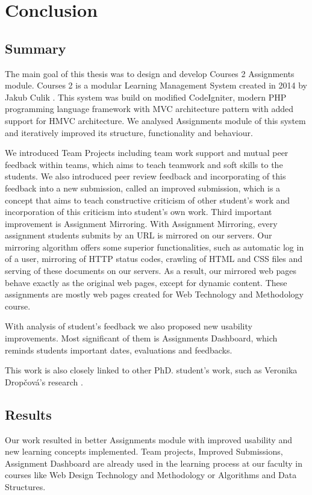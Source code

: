 \chapter*{Conclusion}

\section*{Summary}

The main goal of this thesis was to design and develop Courses 2 Assignments module. Courses 2 is a modular Learning Management System created in 2014 by Jakub Culik \cite{culik}. This system was build on modified CodeIgniter, modern PHP programming language framework with MVC architecture pattern with added support for HMVC architecture. We analysed Assignments module of this system and iteratively improved its structure, functionality and behaviour.

We introduced Team Projects including team work support and mutual peer feedback within teams, which aims to teach teamwork and soft skills to the students. We also introduced peer review feedback and incorporating of this feedback into a new submission, called an improved submission, which is a concept that aims to teach constructive criticism of other student's work and incorporation of this criticism into student's own work. Third important improvement is Assignment Mirroring. With Assignment Mirroring, every assignment students submits by an URL is mirrored on our servers. Our mirroring algorithm offers some superior functionalities, such as automatic log in of a user, mirroring of HTTP status codes, crawling of HTML and CSS files and serving of these documents on our servers. As a result, our mirrored web pages behave exactly as the original web pages, except for dynamic content. These assignments are mostly web pages created for Web Technology and Methodology course.

With analysis of student's feedback we also proposed new usability improvements. Most significant of them is Assignments Dashboard, which reminds students important dates, evaluations and feedbacks.

This work is also closely linked to other PhD. student's work, such as Veronika Drop\v{c}ov\'{a}'s research \cite{dropcova}.

\section*{Results}
Our work resulted in better Assignments module with improved usability and new learning concepts implemented. Team projects, Improved Submissions, Assignment Dashboard are already used in the learning process at our faculty in courses like Web Design Technology and Methodology or Algorithms and Data Structures.


